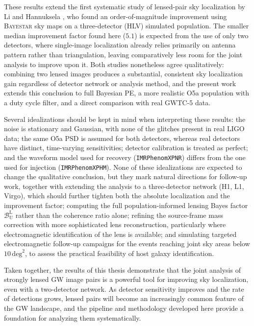 These results extend the first systematic study of lensed-pair sky localization by Li and Hannuksela \cite{Hannuksela_skyloc}, who found an order-of-magnitude improvement using \textsc{Bayestar} sky maps on a three-detector (HLV) simulated population. The smaller median improvement factor found here ($5.1$) is expected from the use of only two detectors, where single-image localization already relies primarily on antenna pattern rather than triangulation, leaving comparatively less room for the joint analysis to improve upon it. Both studies nonetheless agree qualitatively: combining two lensed images produces a substantial, consistent sky localization gain regardless of detector network or analysis method, and the present work extends this conclusion to full Bayesian PE, a more realistic O5a population with a duty cycle filter, and a direct comparison with real GWTC-5 data.

Several idealizations should be kept in mind when interpreting these results: the noise is stationary and Gaussian, with none of the glitches present in real LIGO data; the same O5a PSD is assumed for both detectors, whereas real detectors have distinct, time-varying sensitivities; detector calibration is treated as perfect; and the waveform model used for recovery (\texttt{IMRPhenomXPNR}) differs from the one used for injection (\texttt{IMRPhenomXPHM}). None of these idealizations are expected to change the qualitative conclusion, but they mark natural directions for follow-up work, together with extending the analysis to a three-detector network (H1, L1, Virgo), which should further tighten both the absolute localization and the improvement factor; computing the full population-informed lensing Bayes factor $\mathcal{B}_\mathrm{U}^\mathrm{L}$ rather than the coherence ratio alone; refining the source-frame mass correction with more sophisticated lens reconstruction, particularly where electromagnetic identification of the lens is available; and simulating targeted electromagnetic follow-up campaigns for the events reaching joint sky areas below $10\,\mathrm{deg}^2$, to assess the practical feasibility of host galaxy identification.

Taken together, the results of this thesis demonstrate that the joint analysis of strongly lensed GW image pairs is a powerful tool for improving sky localization, even with a two-detector network. As detector sensitivity improves and the rate of detections grows, lensed pairs will become an increasingly common feature of the GW landscape, and the pipeline and methodology developed here provide a foundation for analyzing them systematically.

